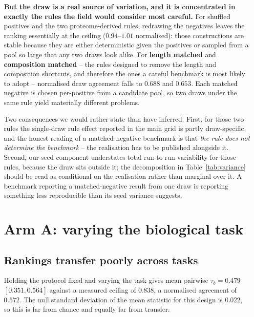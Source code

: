 \documentclass[11pt,a4paper]{article}
\begin{document}
\textbf{But the draw is a real source of variation, and it is concentrated in exactly the
rules the field would consider most careful.} For shuffled positives and the two
proteome-derived rules, redrawing the negatives leaves the ranking essentially at the
ceiling ($0.94$--$1.01$ normalised): those constructions are stable because they are either
deterministic given the positives or sampled from a pool so large that any two draws look
alike. For \textbf{length matched} and \textbf{composition matched} -- the rules designed to
remove the length and composition shortcuts, and therefore the ones a careful benchmark is
most likely to adopt -- normalised draw agreement falls to $0.688$ and $0.653$. Each
matched negative is chosen per-positive from a candidate pool, so two draws under the same
rule yield materially different problems.

Two consequences we would rather state than have inferred. First, for those two rules the
single-draw rule effect reported in the main grid is partly draw-specific, and the honest
reading of a matched-negative benchmark is that \emph{the rule does not determine the
benchmark} -- the realisation has to be published alongside it. Second, our seed component
understates total run-to-run variability for those rules, because the draw sits outside it;
the decomposition in Table~\ref{tab:variance} should be read as conditional on the
realisation rather than marginal over it. A benchmark reporting a matched-negative result
from one draw is reporting something less reproducible than its seed variance suggests.

\section{Arm A: varying the biological task}

\subsection{Rankings transfer poorly across tasks}

Holding the protocol fixed and varying the task gives mean pairwise $\tau_b = 0.479$
$[0.351, 0.564]$ against a measured ceiling of $0.838$, a normalised agreement of
$\mathbf{0.572}$. The null standard deviation of the mean statistic for this design is
$0.022$, so this is far from chance and equally far from transfer.
\end{document}
